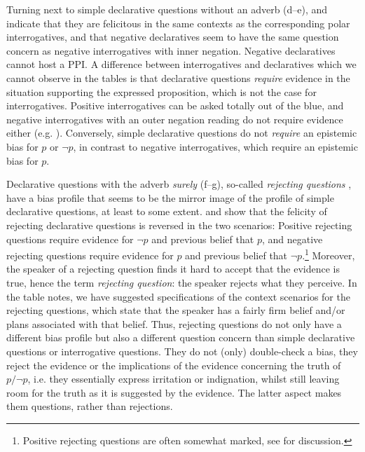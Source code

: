 \documentclass[output=paper,colorlinks,citecolor=brown]{langscibook}
\begin{document}
Turning next to simple declarative questions without an adverb (d--e),  and  indicate that they are felicitous in the same contexts as the corresponding polar interrogatives, and that negative declaratives seem to have the same question concern as negative interrogatives with inner negation. Negative declaratives cannot host a PPI. A difference between interrogatives and declaratives which we cannot observe in the tables is that declarative questions \textit{require} evidence in the situation supporting the expressed proposition, which is not the case for interrogatives. Positive interrogatives can be asked totally out of the blue, and negative interrogatives with an outer negation reading do not require evidence either (e.g. \cite{BueGun2000}). Conversely, simple declarative questions do not \textit{require} an epistemic bias for $p$ or $\neg p$, in contrast to negative interrogatives, which require an epistemic bias for $p$.

Declarative questions with the adverb \textit{surely} (f--g), so-called \textit{rejecting questions} \citep{Seeliger15, Seeliger2019Swedish, Seeliger18}, have a bias profile that seems to be the mirror image of the profile of simple declarative questions, at least to some extent.  and  show that the felicity of rejecting declarative questions is reversed in the two scenarios: Positive rejecting questions require evidence for $\neg p$ and previous belief that $p$, and negative rejecting questions require evidence for $p$ and previous belief that $\neg p$.\footnote[4]{Positive rejecting questions are often somewhat marked, see \citet{Seeliger2019Swedish} for discussion.} Moreover, the speaker of a rejecting question finds it hard to accept that the evidence is true, hence the term \textit{rejecting question}: the speaker rejects what they perceive. In the table notes, we have suggested specifications of the context scenarios for the rejecting questions, which state that the speaker has a fairly firm belief and/or plans associated with that belief. Thus, rejecting questions do not only have a different bias profile but also a different question concern than simple declarative questions or interrogative questions. They do not (only) double-check a bias, they reject the evidence or the implications of the evidence concerning the truth of $p / \neg p$, i.e. they essentially express irritation or indignation, whilst still leaving room for the truth as it is suggested by the evidence. The latter aspect makes them questions, rather than rejections.
\end{document}
